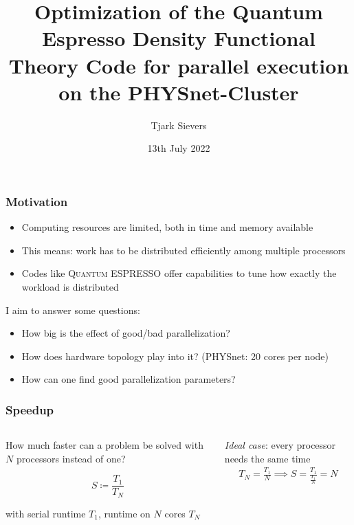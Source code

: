 \documentclass[aspectratio=169]{beamer}
\title[Bachelor's Colloquium]{Optimization of the Quantum Espresso Density Functional Theory Code for parallel execution on the PHYSnet-Cluster}
\author{Tjark Sievers}
\date{13th July 2022}
\institute[I. ITP -- AG Computational Condensed Matter Theory]{I. Institute of Theoretical Physics}
\newcommand{\QE}{\textsc{Quantum} ESPRESSO\xspace}
\begin{document}
{
\begin{frame}
	\titlepage
\end{frame}
}
\addtocounter{framenumber}{-1}

\begin{frame}
	\frametitle{Motivation}

	\begin{itemize}
		\item Computing resources are limited, both in time and memory available
		\item This means: work has to be distributed efficiently among multiple processors
		\item Codes like \QE offer capabilities to tune how exactly the workload is distributed
	\end{itemize}

	\vspace{10pt}

	\pause

	I aim to answer some questions:

	\begin{itemize}
		\item How big is the effect of good/bad parallelization?
		\item How does hardware topology play into it? (PHYSnet: 20 cores per node)
		\item How can one find good parallelization parameters?
	\end{itemize}
\end{frame}



\begin{frame}[t]
	\frametitle{Speedup}

	\begin{columns}
		\begin{column}[T]{0.48\textwidth}
			How much faster can a problem be solved with \(N\) processors instead of one?
			
			\begin{equation*}
				S \coloneqq \frac{T_1}{T_N}
			\end{equation*}

			with serial runtime \(T_1\), runtime on \(N\) cores \(T_N\)
		\end{column}
		\begin{column}[T]{0.48\textwidth}
			\emph{Ideal case}: every processor needs the same time
			\begin{align*}
				T_N = \frac{T_1}{N}
				\implies S = \frac{T_1}{\frac{T_1}{N}} = N
			\end{align*}
		\end{column}
	\end{columns}
\end{frame}
\end{document}
